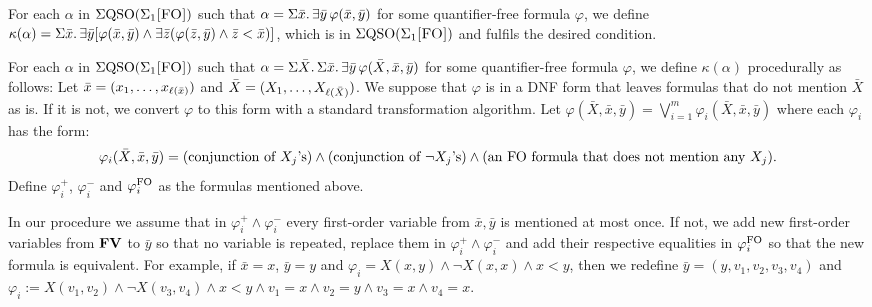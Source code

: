 \vspace{1em}

For each $\alpha$ in $\Sigma{\rm QSO}(\Sigma_{1}\textsc{[FO]})$ such that $\alpha = \Sigma{\bar{x}}.\,\exists\bar{y}\,\varphi(\bar{x},\bar{y})$ for some quantifier-free formula $\varphi$, we define $\kappa(\alpha) = \Sigma{\bar{x}}.\,\exists\bar{y}[\varphi(\bar{x},\bar{y})\wedge\exists\bar{z}(\varphi(\bar{z},\bar{y})\wedge\bar{z} < \bar{x})]$, which is in $\Sigma{\rm QSO}(\Sigma_{1}\textsc{[FO]})$ and fulfils the desired condition.

\vspace{1em}

For each $\alpha$ in $\Sigma{\rm QSO}(\Sigma_{1}\textsc{[FO]})$ such that $\alpha = \Sigma{\bar{X}}.\,\Sigma{\bar{x}}.\,\exists\bar{y}\,\varphi(\bar{X},\bar{x},\bar{y})$ for some quantifier-free formula $\varphi$, we define $\kappa(\alpha)$ procedurally as follows: Let $\bar{x} = (x_1,\ldots,x_{\ell(\bar{x})})$ and $\bar{X} = (X_1,\ldots,X_{\ell(\bar{X})})$. We suppose that $\varphi$ is in a DNF form that leaves formulas that do not mention $\bar{X}$ as is. If it is not, we convert $\varphi$ to this form with a standard transformation algorithm. Let $\varphi(\bar{X},\bar{x},\bar{y}) = \bigvee_{i = 1}^m\varphi_i(\bar{X},\bar{x},\bar{y})$ where each $\varphi_i$ has the form:
$$
\varphi_i(\bar{X},\bar{x},\bar{y}) = (\text{conjunction of $X_j$'s}) \wedge (\text{conjunction of $\neg X_j$'s})  \wedge (\text{an ${\rm FO}$ formula that does not mention any $X_j$}).
$$
Define $\varphi_i^{+}$, $\varphi_i^{-}$ and $\varphi_i^{{\rm FO}}$ as the formulas mentioned above. 

In our procedure we assume that in $\varphi_i^{+}\wedge\varphi_i^{-}$ every first-order variable from $\bar{x},\bar{y}$ is mentioned at most once. If not, we add new first-order variables from $\mathbf{FV}$ to $\bar{y}$ so that no variable is repeated, replace them in $\varphi_i^{+}\wedge\varphi_i^{-}$ and add their respective equalities in $\varphi_i^{{\rm FO}}$ so that the new formula is equivalent. For example, if $\bar{x} = x$, $\bar{y} = y$ and $\varphi_i = X(x,y)\wedge \neg X(x,x) \wedge x < y$, then we redefine $\bar{y} = (y,v_1,v_2,v_3,v_4)$ and $\varphi_i := X(v_1,v_2) \wedge \neg X(v_3,v_4) \wedge x < y \wedge v_1 = x \wedge v_2 = y \wedge v_3 = x \wedge v_4 = x.$ 

